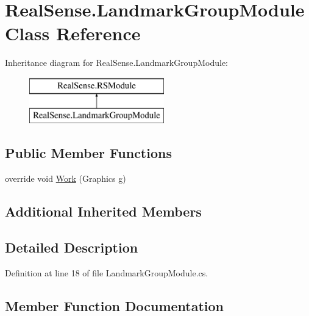 \hypertarget{class_real_sense_1_1_landmark_group_module}{}\section{Real\+Sense.\+Landmark\+Group\+Module Class Reference}
\label{class_real_sense_1_1_landmark_group_module}
Inheritance diagram for Real\+Sense.\+Landmark\+Group\+Module\+:\begin{figure}[H]
\begin{center}
\leavevmode
\includegraphics[height=2.000000cm]{class_real_sense_1_1_landmark_group_module}
\end{center}
\end{figure}
\subsection*{Public Member Functions}
\begin{DoxyCompactItemize}
\item 
override void \hyperlink{class_real_sense_1_1_landmark_group_module_aae68525cdcf843719e02fa9b7317d3fa}{Work} (Graphics g)
\end{DoxyCompactItemize}
\subsection*{Additional Inherited Members}


\subsection{Detailed Description}


Definition at line 18 of file Landmark\+Group\+Module.\+cs.



\subsection{Member Function Documentation}
\mbox{\label{class_real_sense_1_1_landmark_group_module_aae68525cdcf843719e02fa9b7317d3fa}} 
